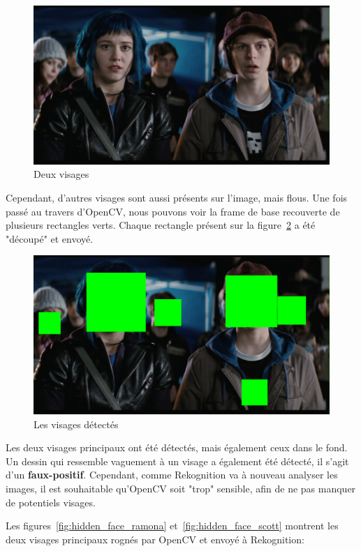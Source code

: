 \begin{figure}[H]
	\centering
	\includegraphics[width=12cm]{images/facial_reco/scott.jpg}
    \caption{Deux visages}
	\label{fig:scott}
\end{figure}

Cependant, d'autres visages sont aussi présents sur l'image, mais flous. 
Une fois passé au travers d'OpenCV, nous pouvons voir la frame de base recouverte de plusieurs rectangles verts.
Chaque rectangle présent sur la figure~\ref{fig:hidden_face} a été "découpé" et envoyé.

\begin{figure}[H]
	\centering
	\includegraphics[width=12cm]{images/facial_reco/hidden_face.png}
    \caption{Les visages détectés}
	\label{fig:hidden_face}
\end{figure}

Les deux visages principaux ont été détectés, mais également ceux dans le fond.
Un dessin qui ressemble vaguement à un visage a également été détecté, il s'agit d'un \textbf{faux-positif}.
Cependant, comme Rekognition va à nouveau analyser les images, il est souhaitable qu'OpenCV
soit "trop" sensible, afin de ne pas manquer de potentiels visages.

Les figures~\ref{fig:hidden_face_ramona} et~\ref{fig:hidden_face_scott} montrent les deux visages principaux rognés par OpenCV et envoyé à Rekognition:

